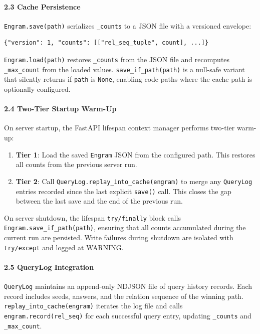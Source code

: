 \paragraph{2.3 Cache Persistence}
\texttt{Engram.save(path)} serializes \texttt{\_counts} to a JSON file with a versioned envelope:

\begin{lstlisting}
{"version": 1, "counts": [["rel_seq_tuple", count], ...]}
\end{lstlisting}

\texttt{Engram.load(path)} restores \texttt{\_counts} from the JSON file and recomputes \texttt{\_max\_count} from the loaded values. \texttt{save\_if\_path(path)} is a null-safe variant that silently returns if \texttt{path} is \texttt{None}, enabling code paths where the cache path is optionally configured.

\paragraph{2.4 Two-Tier Startup Warm-Up}
On server startup, the FastAPI lifespan context manager performs two-tier warm-up:

\begin{enumerate}
\item \textbf{Tier 1}: Load the saved \texttt{Engram} JSON from the configured path. This restores all counts from the previous server run.
\item \textbf{Tier 2}: Call \texttt{QueryLog.replay\_into\_cache(engram)} to merge any \texttt{QueryLog} entries recorded since the last explicit \texttt{save()} call. This closes the gap between the last save and the end of the previous run.

\end{enumerate}
On server shutdown, the lifespan \texttt{try/finally} block calls \texttt{Engram.save\_if\_path(path)}, ensuring that all counts accumulated during the current run are persisted. Write failures during shutdown are isolated with \texttt{try/except} and logged at WARNING.

\paragraph{2.5 QueryLog Integration}
\texttt{QueryLog} maintains an append-only NDJSON file of query history records. Each record includes seeds, answers, and the relation sequence of the winning path. \texttt{replay\_into\_cache(engram)} iterates the log file and calls \texttt{engram.record(rel\_seq)} for each successful query entry, updating \texttt{\_counts} and \texttt{\_max\_count}.

